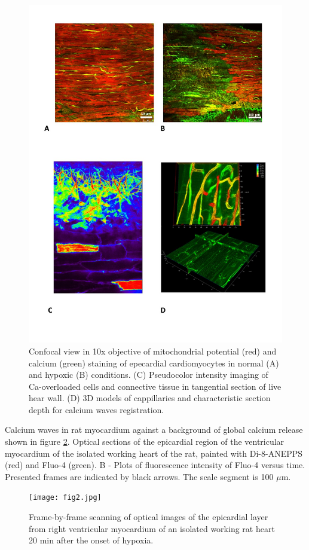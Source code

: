 \documentclass{biophys-new}
\begin{document}
\begin{figure}[hbt!]
\centering
\includegraphics[width=0.8\linewidth]{fig1.jpg}
\caption{Confocal view in 10x objective of mitochondrial potential (red) and calcium (green) staining of epecardial cardiomyocytes in normal (A) and hypoxic (B) conditions. (C) Pseudocolor intensity imaging of Ca-overloaded cells and connective tissue in  tangential section of live hear wall. (D) 3D models of  cappillaries and characteristic section depth for calcium waves registration.}
\label{fig:fig1}
\end{figure}


Calcium waves in rat myocardium against a background of global calcium release shown in figure \ref{fig:fig2}. Optical sections of the epicardial region of the ventricular myocardium of the isolated working heart of the rat, painted with Di-8-ANEPPS (red) and Fluo-4 (green). B - Plots of fluorescence intensity of Fluo-4 versus time. Presented frames are indicated by black arrows. The scale segment is 100 $\mu$m.


\begin{figure}
    \texttt{[image: fig2.jpg]}
    \caption{Frame-by-frame scanning of optical images of the epicardial layer from right ventricular myocardium of an isolated working rat heart 20 min after the onset of hypoxia.}
    \label{fig:fig2}
\end{figure}
\end{document}
